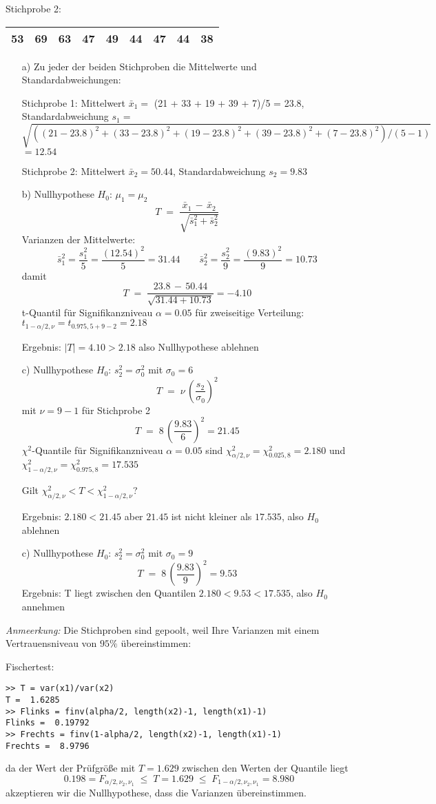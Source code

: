 Stichprobe 2:

\begin{tabular}{|c|c|c|c|c|c|c|c|c|}
\hline
53 & 69 & 63 & 47 & 49 & 44 & 47 & 44 & 38\\
\hline
\end{tabular}

\begin{itemize}
\item[a)] Zu jeder der beiden Stichproben die Mittelwerte und Standardabweichungen:

Stichprobe 1: Mittelwert $\bar x_1 = $ (21 + 33 + 19 + 39 + 7)/5 = 23.8,
Standardabweichung $s_1 = $ $\sqrt{((21-23.8)^2 + (33-23.8)^2 + (19-23.8)^2 + (39-23.8)^2 + (7-23.8)^2)/(5-1)}$ $= 12.54$

Stichprobe 2: Mittelwert $\bar x_2 = 50.44$, Standardabweichung $s_2 = 9.83$

\item[b)] Nullhypothese $H_0$: $\mu_1 = \mu_2$
$$
T \; = \; \frac{\bar x_1 \, - \, \bar x_2}{\sqrt{\bar s_1^2 + \bar s_2^2}}
$$
Varianzen der Mittelwerte:
$$
\bar s_1^2 = \frac{s_1^2}{5} = \frac{(12.54)^2}{5} = 31.44
\qquad
\bar s_2^2 = \frac{s_2^2}{9} = \frac{(9.83)^2}{9} = 10.73
$$
damit
$$
T \; = \; \frac{23.8 \, - \, 50.44}{\sqrt{31.44 + 10.73}} = -4.10
$$
t-Quantil für Signifikanzniveau $\alpha = 0.05$ für zweiseitige Verteilung:
$t_{1-\alpha/2,\nu} = t_{0.975,5+9-2} = 2.18$

Ergebnis: $|T| = 4.10 > 2.18$ also Nullhypothese ablehnen

\item[c)] Nullhypothese $H_0$: $s_2^2 = \sigma_0^2$ mit $\sigma_0 = 6$
$$
T \; = \; \nu \, \left( \frac{s_2}{\sigma_0} \right)^2
$$
mit $\nu = 9-1$ für Stichprobe 2
$$
T \; = \; 8 \, \left( \frac{9.83}{6} \right)^2 = 21.45
$$
$\chi^2$-Quantile für Signifikanzniveau $\alpha = 0.05$ sind
$\chi^2_{\alpha/2,\nu} = \chi^2_{0.025,8} = 2.180$ und
$\chi^2_{1-\alpha/2,\nu} = \chi^2_{0.975,8} = 17.535$

Gilt $\chi^2_{\alpha/2,\nu} < T < \chi^2_{1-\alpha/2,\nu}$?

Ergebnis: $2.180 < 21.45$ aber $21.45$ ist nicht kleiner als $17.535$, also $H_0$ ablehnen

\item[c)] Nullhypothese $H_0$: $s_2^2 = \sigma_0^2$ mit $\sigma_0 = 9$
$$
T \; = \; 8 \, \left( \frac{9.83}{9} \right)^2 = 9.53
$$
Ergebnis:
T liegt zwischen den Quantilen $2.180 < 9.53 < 17.535$, also $H_0$ annehmen
\end{itemize}

\textsl{Anmeerkung:} Die Stichproben sind gepoolt, weil Ihre Varianzen mit einem  Vertrauensniveau
von $95 \%$ übereinstimmen:

Fischertest:
\begin{verbatim}
>> T = var(x1)/var(x2)
T =  1.6285
>> Flinks = finv(alpha/2, length(x2)-1, length(x1)-1)
Flinks =  0.19792
>> Frechts = finv(1-alpha/2, length(x2)-1, length(x1)-1)
Frechts =  8.9796
\end{verbatim}
da der Wert der Prüfgröße mit $T = 1.629$ zwischen den Werten der Quantile liegt
$$
0.198 = F_{\alpha/2,\nu_2,\nu_1} \; \leq \; T = 1.629
\; \leq \; F_{1-\alpha/2,\nu_2,\nu_1} =  8.980
$$
akzeptieren wir die Nullhypothese, dass die Varianzen übereinstimmen.
